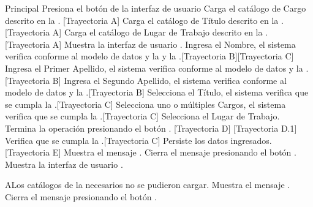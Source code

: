 \begin{UCtrayectoria}{Principal}
    \UCpaso[\UCactor] Presiona el botón \IUbutton{(+)} de la interfaz de usuario 
    \UCpaso Carga el catálogo de Cargo descrito en la . [Trayectoria A]
    \UCpaso Carga el catálogo de Título descrito en la . [Trayectoria A]
    \UCpaso Carga el catálogo de Lugar de Trabajo descrito en la . [Trayectoria A]
    \UCpaso Muestra la interfaz de usuario .
    \UCpaso[\UCactor] Ingresa el Nombre, el sistema verifica conforme al modelo de datos y la  y la .[Trayectoria B][Trayectoria C]
    \UCpaso[\UCactor] Ingresa el Primer Apellido, el sistema verifica conforme al modelo de datos y la .[Trayectoria B]
    \UCpaso[\UCactor] Ingresa el Segundo Apellido, el sistema verifica conforme al modelo de datos y la .[Trayectoria B]
    \UCpaso[\UCactor] Selecciona el Título, el sistema verifica que se cumpla la .[Trayectoria C]
    \UCpaso[\UCactor] Selecciona uno o múltiples Cargos, el sistema verifica que se cumpla la .[Trayectoria C]
    \UCpaso[\UCactor] Selecciona el Lugar de Trabajo.
    \UCpaso[\UCactor] Termina la operación presionando el botón . [Trayectoria D] [Trayectoria D.1]
    \UCpaso Verifica que se cumpla la .[Trayectoria C]
    \UCpaso Persiste los datos ingresados. [Trayectoria E]
    \UCpaso Muestra el mensaje .
    \UCpaso[\UCactor] Cierra el mensaje presionando el botón .
    \UCpaso Muestra la interfaz de usuario .
\end{UCtrayectoria}
\begin{UCtrayectoriaA}{A}{Los catálogos de la  necesarios no se pudieron cargar.}
    \UCpaso Muestra el mensaje .
    \UCpaso[\UCactor] Cierra el mensaje presionando el botón .
\end{UCtrayectoriaA}
